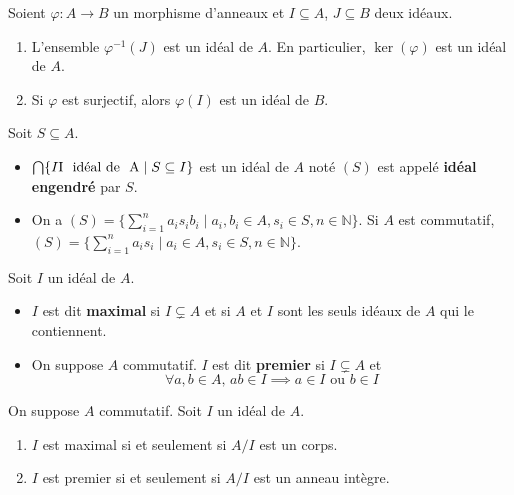   \begin{proposition}
    Soient $\varphi : A \rightarrow B$ un morphisme d'anneaux et $I \subseteq A$, $J \subseteq B$ deux idéaux.
    \begin{enumerate}[label=(\roman*)]
      \item L'ensemble $\varphi^{-1}(J)$ est un idéal de $A$. En particulier, $\ker(\varphi)$ est un idéal de $A$.
      \item Si $\varphi$ est surjectif, alors $\varphi(I)$ est un idéal de $B$.
    \end{enumerate}
  \end{proposition}

  \begin{definition}
    Soit $S \subseteq A$.
    \begin{itemize}
      \item $\bigcap \{ I \text{I \text{ idéal de } A} \mid S \subseteq I \}$ est un idéal de $A$ noté $(S)$ est appelé \textbf{idéal engendré} par $S$.
      \item On a $(S) = \{ \sum_{i=1}^n a_i s_i b_i \mid a_i, b_i \in A, s_i \in S, n \in \mathbb{N} \}$. Si $A$ est commutatif, $(S) = \{ \sum_{i=1}^n a_i s_i \mid a_i \in A, s_i \in S, n \in \mathbb{N} \}$.
    \end{itemize}
  \end{definition}


  \begin{definition}
    Soit $I$ un idéal de $A$.
    \begin{itemize}
      \item $I$ est dit \textbf{maximal} si $I \subsetneq A$ et si $A$ et $I$ sont les seuls idéaux de $A$ qui le contiennent.
      \item On suppose $A$ commutatif. $I$ est dit \textbf{premier} si $I \subsetneq A$ et
      \[ \forall a, b \in A, \, ab \in I \implies a \in I \text{ ou } b \in I \]
    \end{itemize}
  \end{definition}

  \begin{proposition}
    On suppose $A$ commutatif. Soit $I$ un idéal de $A$.
    \begin{enumerate}[label=(\roman*)]
      \item $I$ est maximal si et seulement si $A/I$ est un corps.
      \item $I$ est premier si et seulement si $A/I$ est un anneau intègre.
    \end{enumerate}
  \end{proposition}

